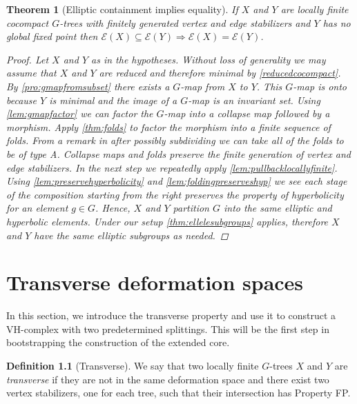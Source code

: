 \documentclass[12pt,parskip=full]{report}
\theoremstyle{plain}
\newtheorem{thm}{Theorem}[section]
\theoremstyle{definition}
\newtheorem{dfn}[thm]{Definition}
\begin{document}
\begin{thm}
    [Elliptic containment implies equality]
    \label{thm:ellipticimpliesequality} 
    If \(X\) and \(Y\) are locally finite cocompact \(G\)-trees with finitely generated vertex and edge stabilizers and \(Y\) has no global fixed point then \(\mathcal{E}(X) \subseteq \mathcal{E}(Y) \Longrightarrow \mathcal{E}(X) = \mathcal{E}(Y) \). 
\begin{proof}

    Let \(X\) and \(Y\) as in the hypotheses. Without loss of generality we may assume that \(X\) and \(Y\) are reduced and therefore minimal by \ref{reducedcocompact}. By \ref{pro:gmapfromsubset} there exists a \(G\)-map from \(X\) to \(Y\). This \(G\)-map is onto because \(Y\) is minimal and the image of a \(G\)-map is an invariant set. Using \ref{lem:gmapfactor} we can factor the \(G\)-map into a collapse map followed by a morphism. Apply \ref{thm:folds} to factor the morphism into a finite sequence of folds. From a remark in \cite{boundingcomplexity} after possibly subdividing we can take all of the folds to be of type A. Collapse maps and folds preserve the finite generation of vertex and edge stabilizers. In the next step we repeatedly apply \ref{lem:pullbacklocallyfinite}. Using \ref{lem:preservehyperbolicity} and \ref{lem:foldingpreserveshyp} we see each stage of the composition starting from the right preserves the property of hyperbolicity for an element \(g\in G\).  Hence, \(X\) and \(Y\) partition \(G\) into the same elliptic and hyperbolic elements. Under our setup \ref{thm:ellelesubgroups} applies, therefore \(X\) and \(Y\) have the same elliptic subgroups as needed.
\end{proof}
\end{thm}

\chapter{Transverse deformation spaces}

In this section, we introduce the transverse property and use it to  construct a VH-complex with two predetermined splittings. This will be the first step in bootstrapping the construction of the extended core.

\begin{dfn}
    [Transverse]
    \label{defn:transverse} 
    We say that two locally finite \(G\)-trees \(X\) and \(Y\) are \emph{transverse} if they are not in the same deformation space and there exist two vertex stabilizers, one for each tree, such that their intersection has Property FP.
\end{dfn}
\end{document}
